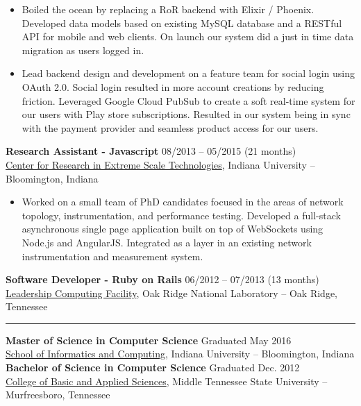 \documentclass[12pt,letterpaper]{article}
\begin{document}
\begin{itemize}

  \item Boiled the ocean by replacing a RoR backend with Elixir / Phoenix. Developed data models based on existing MySQL database and a RESTful API for mobile and web clients. On launch our system did a just in time data migration as users logged in.

  \item Lead backend design and development on a feature team for social login using OAuth 2.0. Social login resulted in more account creations by reducing friction. Leveraged Google Cloud PubSub to create a soft real-time system for our users with Play store subscriptions. Resulted in our system being in sync with the payment provider and seamless product access for our users.

\end{itemize}

\noindent\textbf{Research Assistant - Javascript}
\hfill{08/2013 -- 05/2015 (21 months)} \\
\href{https://pti.iu.edu/centers/crest.html}{Center for Research in Extreme Scale Technologies}, Indiana University -- Bloomington, Indiana

\begin{itemize}

  \item Worked on a small team of PhD candidates focused in the areas of network topology, instrumentation, and performance testing. Developed a full-stack asynchronous single page application built on top of WebSockets using Node.js and AngularJS. Integrated as a layer in an existing network instrumentation and measurement system.

\end{itemize}

\noindent\textbf{Software Developer - Ruby on Rails}
\hfill{06/2012 -- 07/2013 (13 months)} \\
\href{https://www.olcf.ornl.gov/}{Leadership Computing Facility}, Oak Ridge National Laboratory -- Oak Ridge, Tennessee

\noindent\rule{7.5in}{0.4pt}

\noindent\textbf{Master of Science in Computer Science}
\hfill{Graduated May 2016} \\
\href{https://luddy.indiana.edu/}{School of Informatics and Computing}, Indiana University -- Bloomington, Indiana \\

\noindent\textbf{Bachelor of Science in Computer Science}
\hfill{Graduated Dec. 2012} \\
\href{https://www.mtsu.edu/cbas/}{College of Basic and Applied Sciences}, Middle Tennessee State University -- Murfreesboro, Tennessee
\end{document}
